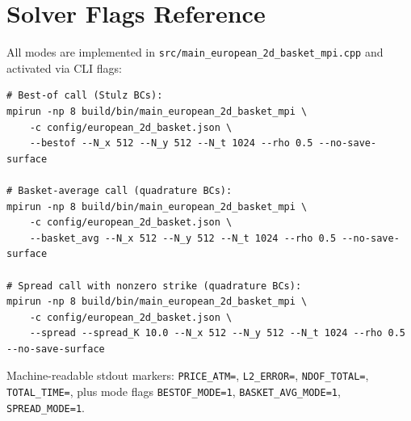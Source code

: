 \documentclass[11pt,a4paper]{article}
\begin{document}
\section{Solver Flags Reference}
\label{app:flags}

All modes are implemented in
\texttt{src/main\_european\_2d\_basket\_mpi.cpp} and activated via CLI flags:

\begin{verbatim}
# Best-of call (Stulz BCs):
mpirun -np 8 build/bin/main_european_2d_basket_mpi \
    -c config/european_2d_basket.json \
    --bestof --N_x 512 --N_y 512 --N_t 1024 --rho 0.5 --no-save-surface

# Basket-average call (quadrature BCs):
mpirun -np 8 build/bin/main_european_2d_basket_mpi \
    -c config/european_2d_basket.json \
    --basket_avg --N_x 512 --N_y 512 --N_t 1024 --rho 0.5 --no-save-surface

# Spread call with nonzero strike (quadrature BCs):
mpirun -np 8 build/bin/main_european_2d_basket_mpi \
    -c config/european_2d_basket.json \
    --spread --spread_K 10.0 --N_x 512 --N_y 512 --N_t 1024 --rho 0.5 --no-save-surface
\end{verbatim}

Machine-readable stdout markers: \texttt{PRICE\_ATM=}, \texttt{L2\_ERROR=},
\texttt{NDOF\_TOTAL=}, \texttt{TOTAL\_TIME=}, plus mode flags
\texttt{BESTOF\_MODE=1}, \texttt{BASKET\_AVG\_MODE=1}, \texttt{SPREAD\_MODE=1}.

\end{document}
